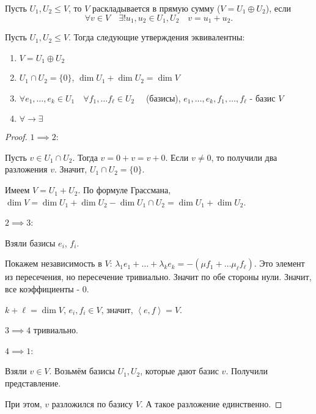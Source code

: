 \begin{definition} \thmslashn 

    Пусть $U_1, U_2 \le V$, то $V$ раскладывается в прямую сумму ($V = U_1 \oplus U_2$), если 
    \[ \forall{v\in V}\quad \exists!{u_1, u_2\in U_1, U_2}\quad v = u_1 + u_2 .\] 
\end{definition}
\begin{statement} \thmslashn

    Пусть $U_1, U_2 \le V$. Тогда следующие утверждения эквивалентны:
    \begin{enumerate}
        \item $V = U_1 \oplus U_2$
        \item $U_1\cap  U_2 = \{0\} $, $\dim U_1 + \dim U_2 = \dim V$
        \item $\forall{e_1, \ldots, e_{k}}\in U_1\quad \forall{f_1, \ldots f_{\ell}\in U_2}\quad  $ (базисы), $e_1, \ldots, e_{k}, f_1, \ldots, f_{\ell}$ - базис $V$
        \item $\forall{} \to \exists{}  $
    \end{enumerate}
    \begin{proof} \thmslashn
    
        $1 \implies 2$:

        Пусть $v\in U_1\cap U_2$. Тогда $v = 0 + v = v + 0$. Если $v \neq 0$, то получили два разложения $v$. Значит, $U_1\cap U_2 = \{0\} $.

        Имеем $V = U_1 + U_2$. По формуле Грассмана, $\dim V = \dim U_1 + \dim U_2 - \dim U_1\cap  U_2 = \dim U_1 + \dim U_2$.

        $2 \implies 3$:

        Взяли базисы $e_{i}$, $f_{i}$.

        Покажем независимость в $V$: $\lambda_1e_1 + \ldots + \lambda_{k}e_{k} = -\left( \mu f_1 + \ldots \mu_{\ell}f_{\ell} \right) $. Это элемент из пересечения, но пересечение тривиально. Значит по обе стороны нули. Значит, все коэффициенты - $0$.

        $k + \ell = \dim V$,  $e_{i}, f_{i}\in V$, значит, $\left<e, f\right> = V$.

        $3 \implies 4$ тривиально.

        $4 \implies 1$:

        Взяли $v\in V$. Возьмём базисы $U_1, U_2$, которые дают базис $v$. Получили представление.

        При этом, $v$ разложился по базису $V$. А такое разложение единственно.
    \end{proof}
\end{statement}
